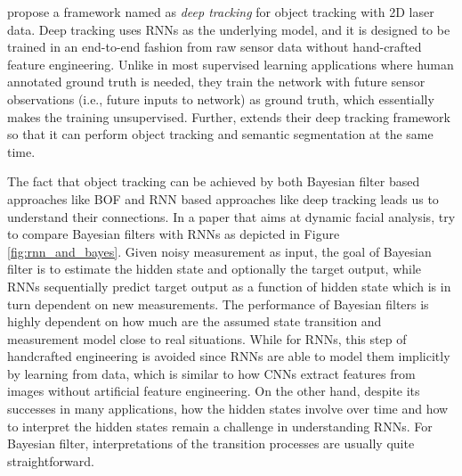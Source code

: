 \citet{ondruska2016deep} propose a framework named as \textit{deep tracking} for object tracking with 2D laser data. Deep tracking uses RNNs as the underlying model, and it is designed to be trained in an end-to-end fashion from raw sensor data without hand-crafted feature engineering. Unlike in most supervised learning applications where human annotated ground truth is needed, they train the network with future sensor observations (i.e., future inputs to network) as ground truth, which essentially makes the training unsupervised. Further, \citet{ondruska2016end} extends their deep tracking framework so that it can perform object tracking and semantic segmentation at the same time. 

The fact that object tracking can be achieved by both Bayesian filter based approaches like BOF and RNN based approaches like deep tracking leads us to understand their connections. In a paper that aims at dynamic facial analysis, \citet{de2017dynamic} try to compare Bayesian filters with RNNs as depicted in Figure \ref{fig:rnn_and_bayes}. Given noisy measurement as input, the goal of Bayesian filter is to estimate the hidden state and optionally the target output, while RNNs sequentially predict target output as a function of hidden state which is in turn dependent on new measurements. The performance of Bayesian filters is highly dependent on how much are the assumed state transition and measurement model close to real situations. While for RNNs, this step of handcrafted engineering is avoided since RNNs are able to model them implicitly by learning from data, which is similar to how CNNs extract features from images without artificial feature engineering. On the other hand, despite its successes in many applications, how the hidden states involve over time and how to interpret the hidden states remain a challenge in understanding RNNs. For Bayesian filter, interpretations of the transition processes are usually quite straightforward. 


